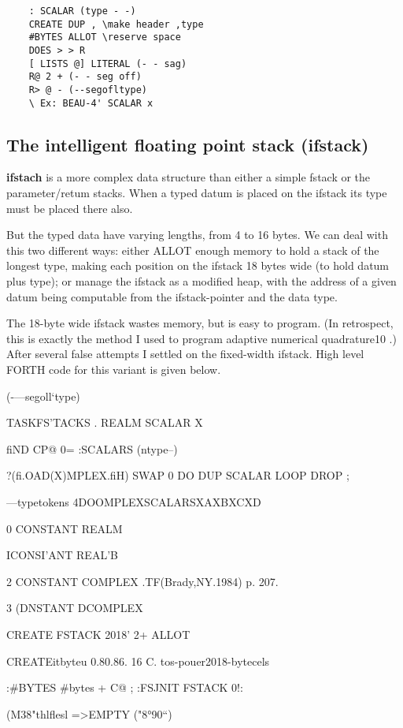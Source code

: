\begin{lstlisting}
    : SCALAR (type - -)
    CREATE DUP , \make header ,type
    #BYTES ALLOT \reserve space
    DOES > > R
    [ LISTS @] LITERAL (- - sag)
    R@ 2 + (- - seg off)
    R> @ - (--segofltype)
    \ Ex: BEAU-4' SCALAR x
\end{lstlisting}

\subsection{The intelligent floating point stack (ifstack)}
 \textbf{ifstach} is a more complex data structure than either a simple fstack or the parameter/retum stacks. When a typed datum is placed on the ifstack its type must be placed there also.

But the typed data have varying lengths, from 4 to 16 bytes. We
can deal with this two different ways: either ALLOT enough
memory to hold a stack of the longest type, making each position
on the ifstack 18 bytes wide (to hold datum plus type); or manage
the ifstack as a modified heap, with the address of a given datum
being computable from the ifstack-pointer and the data type.

The 18-byte wide ifstack wastes memory, but is easy to program.
(In retrospect, this is exactly the method I used to program
adaptive numerical quadrature10 .) After several false attempts I
settled on the fixed-width ifstack. High level FORTH code for
this variant is given below.

\TYPEDDATASTACKMANAGER (-—segoll‘type)

TASKFS’TACKS \aay. REALM SCALAR X

fiND CP@ 0= :SCALARS (ntype--)

?(fi.OAD(X)MPLEX.fiH) SWAP 0 DO DUP SCALAR LOOP
DROP ;

\ddinedata—typetokens \say4DOOMPLEXSCALARSXAXBXCXD

0 CONSTANT REALM

ICONSI’ANT REAL'B 

2 CONSTANT COMPLEX \Brodle.TF(Brady,NY.1984) p. 207.

3 (DNSTANT DCOMPLEX

CREATE FSTACK 2018' 2+ ALLOT

CREATEitbyteu 0.80.86. 16 C. \2tos-pouer2018-bytecels

:#BYTES #bytes + C@ ; :FSJNIT FSTACK 0!:

(M38"thlflesl =>EMPTY ("8°90“)

